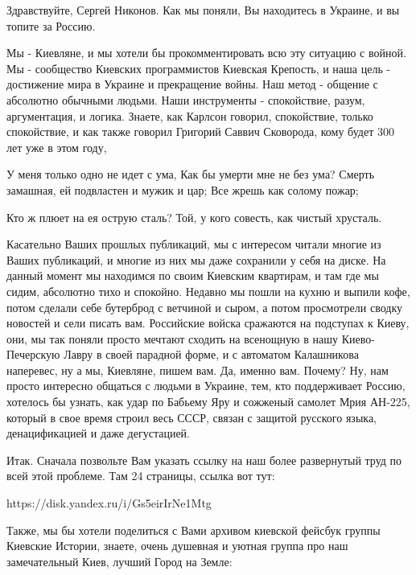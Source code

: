  
 
 
 
 


Здравствуйте, Сергей Никонов. Как мы поняли, Вы находитесь в Украине, и вы топите за Россию.

Мы - Киевляне, и мы хотели бы прокомментировать всю эту ситуацию с войной.  Мы
- сообщество Киевских программистов Киевская Крепость, и наша цель - достижение
мира в Украине и прекращение войны.  Наш метод - общение с абсолютно обычными
людьми. Наши инструменты - спокойствие, разум, аргументация, и логика. Знаете,
как Карлсон говорил, спокойствие, только спокойствие, и как также говорил
Григорий Саввич Сковорода, кому будет 300 лет уже в этом году,

У меня только одно не идет с ума,
Как бы умерти мне не без ума?
Смерть замашная, ей подвластен и мужик и цар;
Все жрешь как солому пожар;

Кто ж плюет на ея острую сталь?
Той, у кого совесть, как чистый хрусталь.

Касательно Ваших прошлых публикаций, мы с интересом читали многие из Ваших
публикаций, и многие из них мы даже сохранили у себя на диске. На данный момент
мы находимся по своим Киевским квартирам, и там где мы сидим, абсолютно тихо и
спокойно. Недавно мы пошли на кухню и выпили кофе, потом сделали себе бутерброд
с ветчиной и сыром, а потом просмотрели сводку новостей и сели писать вам.
Российские войска сражаются на подступах к Киеву, они, мы так поняли просто
мечтают сходить на всенощную в нашу Киево-Печерскую Лавру в своей парадной
форме, и с автоматом Калашникова наперевес, ну а мы, Киевляне, пишем вам. Да,
именно вам.  Почему?  Ну, нам просто интересно общаться с людьми в Украине,
тем, кто поддерживает Россию, хотелось бы узнать, как удар по Бабьему Яру и
сожженый самолет Мрия АН-225, который в свое время строил весь СССР, связан с
защитой русского языка, денацификацией и даже дегустацией.

Итак. Сначала позвольте Вам указать ссылку на наш более развернутый труд по
всей этой проблеме. Там 24 страницы, ссылка вот тут:

https://disk.yandex.ru/i/Gs5eirIrNe1Mtg

Также, мы бы хотели поделиться с Вами архивом киевской фейсбук группы Киевские Истории,
знаете, очень душевная и уютная группа про наш замечательный Киев, лучший Город на Земле:

